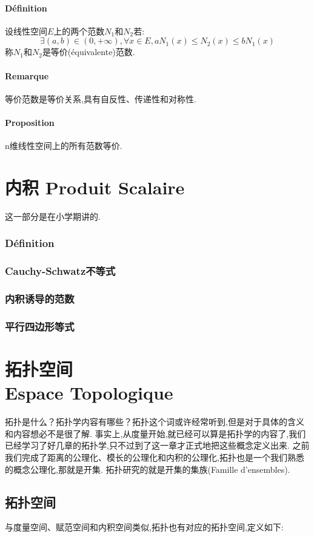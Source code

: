 \documentclass[12pt, a4paper, oneside]{ctexbook}
\begin{document}
  \subsubsection{Définition}
  设线性空间$E$上的两个范数$N_1$和$N_2$若:
  $$
    \exists(a,b)\in(0,+\infty),\forall x\in E,aN_1(x)\leq N_2(x)\leq bN_1(x)
  $$称$N_1$和$N_2$是等价(équivalente)范数.
  \subsubsection{Remarque}
  等价范数是等价关系,具有自反性、传递性和对称性.
  \subsubsection{Proposition}
  n维线性空间上的所有范数等价.

\chapter{内积 Produit Scalaire}
  这一部分是在小学期讲的.
    \subsection{Définition}
    \subsection{Cauchy-Schwatz不等式}
    \subsection{内积诱导的范数}
    \subsection{平行四边形等式}


\chapter{拓扑空间\\ Espace Topologique}
拓扑是什么？拓扑学内容有哪些？拓扑这个词或许经常听到,但是对于具体的含义和内容想必不是很了解.
事实上,从度量开始,就已经可以算是拓扑学的内容了,我们已经学习了好几章的拓扑学,只不过到了这一章才正式地把这些概念定义出来.
之前我们完成了距离的公理化、模长的公理化和内积的公理化,拓扑也是一个我们熟悉的概念公理化,那就是开集.
拓扑研究的就是开集的集族(Famille d'ensembles).
\section{拓扑空间}
  与度量空间、赋范空间和内积空间类似,拓扑也有对应的拓扑空间,定义如下:
\end{document}
